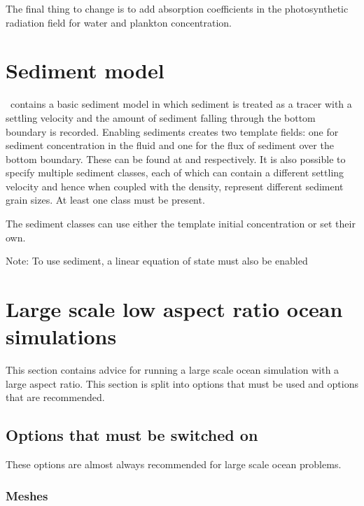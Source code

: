 The final thing to change is to add absorption coefficients in the photosynthetic radiation field for water and plankton concentration.

\section{Sediment model}
\label{config:sediments}

\fluidity\ contains a basic sediment model in which sediment is treated as a
tracer with a settling velocity and the amount of sediment falling through
the bottom boundary is recorded. Enabling sediments creates two template
fields: one for sediment concentration in the fluid and one for the flux of
sediment over the bottom boundary. These can be found at
 and
 respectively.
It is also possible to specify multiple sediment classes, each of which can
contain a different settling velocity and hence when coupled with the
density, represent different sediment grain sizes. At least one class must
be present.

The sediment classes can use either the template initial concentration or set their own.

Note: To use sediment, a linear equation of state must also be enabled 

\section{Large scale low aspect ratio ocean simulations}
\label{section:large-scale-ocean}

This section contains advice for running a large scale ocean simulation with a large aspect ratio. This section is split into options that must be used and options that are recommended.

\subsection{Options that must be switched on}
These options are almost always recommended for large scale ocean problems.

\subsubsection{Meshes}


